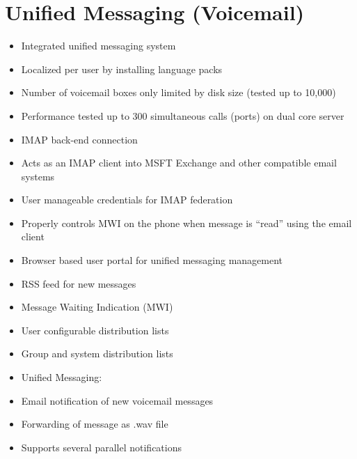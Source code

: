 \documentclass[letterpaper,10pt,english]{sphinxmanual}
\begin{document}
\section{Unified Messaging (Voicemail)}
\label{\detokenize{features:unified-messaging-voicemail}}\begin{itemize}
\item {} 
Integrated unified messaging system

\item {} 
Localized per user by installing language packs

\item {} 
Number of voicemail boxes only limited by disk size (tested up to 10,000)

\item {} 
Performance tested up to 300 simultaneous calls (ports) on dual core server

\item {} 
IMAP back-end connection

\item {} 
Acts as an IMAP client into MSFT Exchange and other compatible email systems

\item {} 
User manageable credentials for IMAP federation

\item {} 
Properly controls MWI on the phone when message is “read” using the email client

\item {} 
Browser based user portal for unified messaging management

\item {} 
RSS feed for new messages

\item {} 
Message Waiting Indication (MWI)

\item {} 
User configurable distribution lists

\item {} 
Group and system distribution lists

\item {} 
Unified Messaging:

\item {} 
Email notification of new voicemail messages

\item {} 
Forwarding of message as .wav file

\item {} 
Supports several parallel notifications


\end{itemize}
\end{document}
